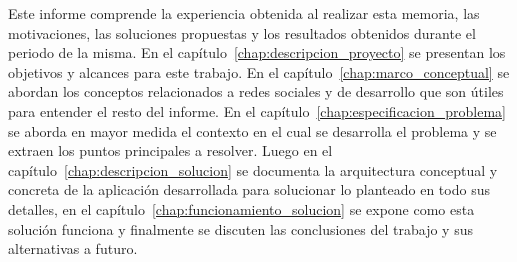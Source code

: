 \begin{intro}
  Este informe comprende la experiencia obtenida al realizar esta memoria, las motivaciones, las soluciones propuestas y los resultados obtenidos durante el periodo de la misma. En el capítulo~\ref{chap:descripcion_proyecto} se presentan los objetivos y alcances para este trabajo. En el capítulo~\ref{chap:marco_conceptual} se abordan los conceptos relacionados a redes sociales y de desarrollo que son útiles para entender el resto del informe. En el capítulo~\ref{chap:especificacion_problema} se aborda en mayor medida el contexto en el cual se desarrolla el problema y se extraen los puntos principales a resolver. Luego en el capítulo~\ref{chap:descripcion_solucion} se documenta la arquitectura conceptual y concreta de la aplicación desarrollada para solucionar lo planteado en todo sus detalles, en el capítulo~\ref{chap:funcionamiento_solucion} se expone como esta solución funciona y finalmente se discuten las conclusiones del trabajo y sus alternativas a futuro.\\
  
\end{intro}